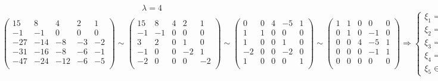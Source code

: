 \documentclass{article}
\newcommand{\la}{\lambda}
\begin{document}
$$\la = 4$$
$$\left(\begin{matrix}
15 & 8 & 4 & 2 & 1 \\
-1 & -1 & 0 & 0 & 0 \\
-27 & -14 & -8 & -3 & -2 \\
-31 & -16 & -8 & -6 & -1 \\
-47 & -24 & -12 & -6 & -5 \\
\end{matrix}\right) \sim \left(\begin{matrix}
15 & 8 & 4 & 2 & 1 \\
-1 & -1 & 0 & 0 & 0 \\
3 & 2 & 0 & 1 & 0 \\
-1 & 0 & 0 & -2 & 1 \\
-2 & 0 & 0 & 0 & -2 \\
\end{matrix}\right) \sim \left(\begin{matrix}
0 & 0 & 4 & -5 & 1 \\
1 & 1 & 0 & 0 & 0 \\
1 & 0 & 0 & 1 & 0 \\
-2 & 0 & 0 & -2 & 0 \\
1 & 0 & 0 & 0 & 1 \\
\end{matrix}\right) \sim \left(\begin{matrix}
1 & 1 & 0 & 0 & 0 \\
0 & 1 & 0 & -1 & 0 \\
0 & 0 & 4 & -5 & 1 \\
0 & 0 & 0 & -1 & 1 \\
0 & 0 & 0 & 0 & 0 \\
\end{matrix}\right) \Rightarrow \begin{cases}
\xi_1 = -\xi_5 \\
\xi_2 = \xi_5 \\
\xi_3 = \xi_5 \\
\xi_4 = \xi_5 \\
\xi_5 \in \mathbb{R}
\end{cases} \Rightarrow v_2 = \begin{pmatrix}
-1 \\ 1 \\ 1 \\ 1 \\ 1
\end{pmatrix}$$
\end{document}
